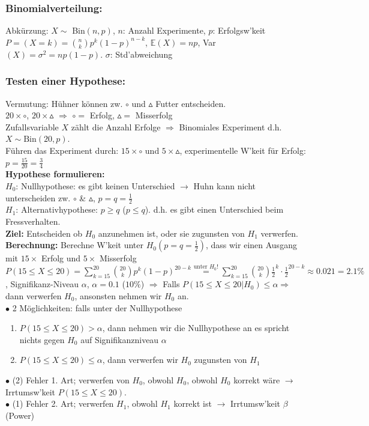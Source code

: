 \documentclass[a4paper,10pt]{article}
\newcommand{\EN}{\mathbb{E}}
\newcommand{\Bold}[1]{\textbf{#1}} %
\newcommand{\T}[1]{\text{#1}} %
\newcommand{\ra}{\rightarrow}
\newcommand{\Ra}{\Rightarrow}
\newcommand{\Sum}[2]{\sum_{#2}^{#1}} %
\newcommand{\Oneover}[1]{\frac{1}{#1}} %
\newcommand{\Oben}[2]{\overset{#1}{#2}} %
\begin{document}
\subsubsection{Binomialverteilung:}
Abkürzung: $X\sim$ Bin$(n,p)$, $n$: Anzahl Experimente, $p$: Erfolgsw'keit\\
$P=(X=k)={n\choose k}p^k(1-p)^{n-k}$, $\EN(X)=np$, Var$(X)=\sigma^2=np(1-p)$. $\sigma$: Std'abweichung
\subsubsection{Testen einer Hypothese:}
Vermutung: Hühner können zw. $\circ$ und $\vartriangle$ Futter entscheiden.\\
$20\times\circ$, $20\times\vartriangle$ $\Ra$ $\circ=$ Erfolg, $\vartriangle=$ Misserfolg\\
Zufallsvariable $X$ zählt die Anzahl Erfolge $\Ra$ Binomiales Experiment d.h. $X\sim\T{Bin}(20,p)$.\\
Führen das Experiment durch: $15\times\circ$ und $5\times\vartriangle$, experimentelle W'keit für Erfolg: $p=\frac{15}{20}=\frac{3}{4}$\\
\Bold{Hypothese formulieren:}\\
$H_0$: Nullhypothese: es gibt keinen Unterschied $\ra$ Huhn kann nicht unterscheiden zw. $\circ$ \& $\vartriangle$, $p=q=\Oneover{2}$\\
$H_1$: Alternativhypothese: $p\geq q$ ($p\leq q$). d.h. es gibt einen Unterschied beim Fressverhalten.\\
\Bold{Ziel:} Entscheiden ob $H_0$ anzunehmen ist, oder sie zugunsten von $H_1$ verwerfen.\\
\Bold{Berechnung:} Berechne W'keit unter $H_0(p=q=\Oneover{2})$, dass wir einen Ausgang mit $15\times$ Erfolg und $5\times$ Misserfolg\\
$P(15\leq X\leq20)=\Sum{20}{k=15}{20\choose k}p^k(1-p)^{20-k}\Oben{\T{unter }H_0!}{=}\Sum{20}{k=15}{20\choose k}\Oneover{2}^k\cdot\Oneover{2}^{20-k}\approx0.021=2.1\%$, Signifikanz-Niveau $\alpha$, $\alpha=0.1$ ($10\%$) $\Ra$ Falls $P(15\leq X\leq 20|H_0)\leq\alpha\Ra$ dann verwerfen $H_0$, ansonsten nehmen wir $H_0$ an.\\
$\bullet$ 2 Möglichkeiten: falls unter der Nullhypothese 
\begin{enumerate}
 \item $P(15\leq X\leq 20)>\alpha$, dann nehmen wir die Nullhypothese an es spricht nichts gegen $H_0$ auf Signifikanzniveau $\alpha$
 \item $P(15\leq X\leq 20)\leq \alpha$, dann verwerfen wir $H_0$ zugunsten von $H_1$
\end{enumerate}
$\bullet$ (2) Fehler 1. Art; verwerfen von $H_0$, obwohl $H_0$, obwohl $H_0$ korrekt wäre $\ra$ Irrtumsw'keit $P(15\leq X\leq 20)$.\\
$\bullet$ (1) Fehler 2. Art; verwerfen $H_1$, obwohl $H_1$ korrekt ist $\ra$ Irrtumsw'keit $\beta$ (Power)
\end{document}
